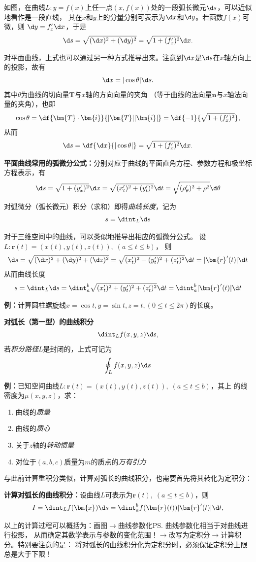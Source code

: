 如图，在曲线$L:y=f(x)$上任一点$(x,f(x))$处的一段弧长微元$\d s$，可以近似地看作是一段直线，
其在$x$和$y$上的分量分别可表示为$\d x$和$\d y$。若函数$f(x)$可微，则
$\d y=f'_x\d x$，于是
$$\d s=\sqrt{(\d x)^2+(\d y)^2}=\sqrt{1+(f'_x)^2}\d x.$$

对平面曲线，上式也可以通过另一种方式推导出来。注意到$\d x$是$\d s$在$x$轴方向上的投影，故有
$$\d x=|\cos\theta|\d s.$$
其中$\theta$为曲线的切向量$\bm{T}$与$x$轴的方向向量的夹角
（等于曲线的法向量$\bm{n}$与$x$轴法向量的夹角），也即
$$\cos\theta=\df{\bm{T}\cdot\bm{i}}{|\bm{T}||\bm{i}|}
=\df{-1}{\sqrt{1+(f'_x)^2}},$$
从而
$$\d s=\df{\d x}{|\cos\theta|}=\sqrt{1+(f'_x)^2}\d x.$$

\begin{thx}
	{\bf 平面曲线常用的弧微分公式：}分别对应于曲线的平面直角方程、参数方程和极坐标方程表示，有
	$$\d s=\sqrt{1+(y'_x)^2}\d x=\sqrt{(x'_t)^2+(y'_t)^2}\d t
	=\sqrt{(\rho'_{\theta})^2+\rho^2}\d\theta$$
\end{thx}

对弧微分（弧长微元）积分（求和）即得{\it 曲线长度}，记为
$$s=\dint_L\d s$$

对于三维空间中的曲线，可以类似地推导出相应的弧微分公式。
设$L:\bm{r}(t)=(x(t),y(t),z(t)),\;(a\leq t\leq b)$， 则
$${\d s=\sqrt{(\d x)^2+(\d y)^2+(\d z)^2}
=\sqrt{(x'_t)^2+(y'_t)^2+(z'_t)^2}\d t} =|\bm{r}'(t)|\d t$$
从而曲线长度
$${s=\dint_L\d s =\dint_a^b\sqrt{(x'_t)^2+(y'_t)^2+(z'_t)^2}\d t
 =\dint_a^b|\bm{r}'(t)|\d t}$$
 
 {\bf 例：}计算圆柱螺旋线$x=\cos t,y=\sin t,z=t,(0\leq t\leq 2\pi)$的长度。

\begin{thx}
	{\bf 对弧长（第一型）的曲线积分}
	$$\dint_Lf(x,y,z)\d s,$$
	若{\it 积分路径}$L$是封闭的，上式可记为
	$$\oint_Lf(x,y,z)\d s$$
\end{thx}

{\bf 例：}已知空间曲线$L:\bm{r}(t)=(x(t),y(t),z(t)),\;(a\leq t\leq b)$，其上
的线密度为$\mu(x,y,z)$，求：
\begin{enumerate}[(1)]
  \setlength{\itemindent}{1cm}
  \item 曲线的{\it 质量}
  \item 曲线的{\it 质心}
  \item 关于$z$轴的{\it 转动惯量}
  \item 对位于$(a,b,c)$质量为$m$的质点的{\it 万有引力}
\end{enumerate}

与此前计算重积分类似，计算对弧长的曲线积分，也需要首先将其转化为定积分：
\begin{thx}
	{\bf 计算对弧长的曲线积分：}设曲线$L$可表示为$\bm{r}(t),\;(a\leq t\leq b)$，则
	$$I=\dint_Lf(\bm{x})\d s=\dint_a^bf(\bm{r}(t))|\bm{r}'(t)|\d t,$$
\end{thx}
以上的计算过程可以概括为：画图$\to$曲线参数化\ps{曲线参数化相当于对曲线进行投影，
从而确定其数学表示与参数的变化范围！}$\to$改写为定积分$\to$计算积分。特别要注意的是：
{\color{red} 将对弧长的曲线积分化为定积分时，必须保证定积分上限总是大于下限！}

